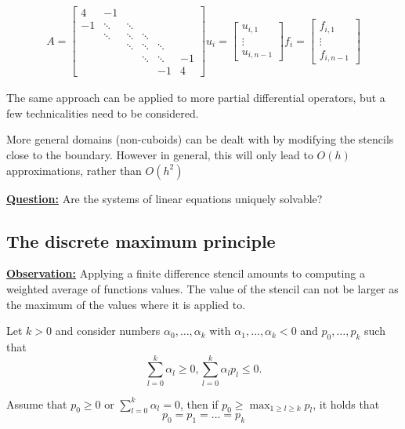 \begin{example}
\begin{align*}
    A=\begin{bmatrix}
        4 & -1 & & & & \\
        -1 &\ddots & \ddots& & &\\
        & \ddots &\ddots & \ddots& &\\
        && \ddots & \ddots & \ddots \\
        & &&\ddots & \ddots & -1\\
        &&&&-1&4
    \end{bmatrix}
    u_i=\begin{bmatrix}
        u_{i,1}\\
        \vdots\\
        u_{i,n-1}
    \end{bmatrix}
    f_i=\begin{bmatrix}
        f_{i,1}\\
        \vdots\\
        f_{i,n-1}
    \end{bmatrix}
\end{align*}

\end{example}


\begin{remark}
    The same approach can be applied to more partial differential operators, but a few technicalities need to be considered.
\end{remark}

\begin{remark}
    More general domains (non-cuboids) can be dealt with by modifying the stencils close to the boundary. However in general, this will only lead to $O(h)$ approximations, rather than $O(h^2)$    
\end{remark}

\underline{\textbf{Question:}} Are the systems of linear equations uniquely solvable?

\subsection{The discrete maximum principle}

\underline{\textbf{Observation:}} Applying a finite difference stencil amounts to computing a weighted average of functions values.
The value of the stencil can not be larger as the maximum of the values where it is applied to.

\begin{lemma}
    Let $k>0$ and consider numbers $\alpha_0,\dots,\alpha_k$ with $\alpha_1,\dots,\alpha_k<0$ and $p_0,\dots,p_k$ such that
    \[\sum_{l=0}^k \alpha_l\geq 0, \sum_{l=0}^k \alpha_lp_l\leq 0.\]

    Assume that $p_0\geq 0$ or $\sum_{l=0}^k\alpha_l=0$, then if $p_0\geq \max_{1\geq l\geq k} p_l$, it holds that 
    \[p_0=p_1=\dots=p_k\]
\end{lemma}

